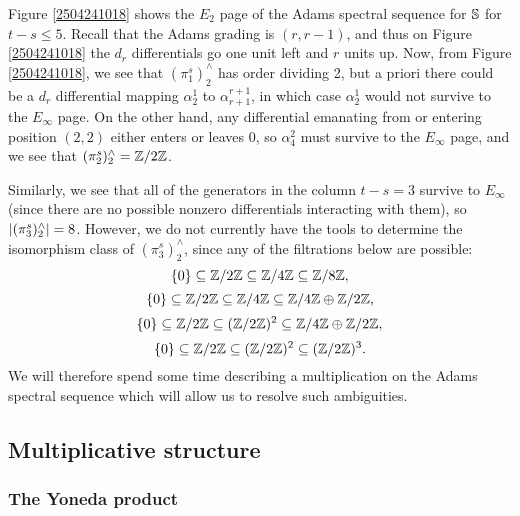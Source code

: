 \documentclass[11pt, titlepage]{article} %
\def\bb{\ensuremath\mathbb}
\def\subq{\ensuremath\subseteq}
\def\inte{\ensuremath\mathbb{Z}}
\numberwithin{equation}{subsection}
\theoremstyle{plain}
\theoremstyle{definition}
\begin{document}
Figure \ref{2504241018} shows the \(E_2\) page of the Adams spectral sequence for \(\bb{S}\) for \(t-s\leq 5\). Recall that the Adams grading is \((r, r-1)\), and thus on Figure \ref{2504241018} the \(d_r\) differentials go one unit left and \(r\) units up. Now, from Figure \ref{2504241018}, we see that \((\pi_1^s)^\wedge_2\) has order dividing 2, but a priori there could be a \(d_r\) differential mapping \(\alpha^1_2\) to \(\alpha^{r+1}_{r+1}\), in which case \(\alpha^1_2\) would not survive to the \(E_\infty\) page. On the other hand, any differential emanating from or entering position \((2,2)\) either enters or leaves 0, so \(\alpha^2_4\) must survive to the \(E_\infty\) page, and we see that \((\pi_2^s)^\wedge_2=\inte/2\inte\). 

Similarly, we see that all of the generators in the column \(t-s=3\) survive to \(E_\infty\) (since there are no possible nonzero differentials interacting with them), so \(\lvert(\pi_3^s)^\wedge_2\rvert=8\). However, we do not currently have the tools to determine the isomorphism class of \((\pi_3^s)^\wedge_2\), since any of the filtrations below are possible:
\[\{0\}\subq \inte/2\inte\subq \inte/4\inte\subq \inte/8\inte,\]
\[\{0\}\subq \inte/2\inte\subq \inte/4\inte\subq \inte/4\inte\oplus \inte/2\inte,\]
\[\{0\}\subq \inte/2\inte\subq (\inte/2\inte)^2\subq \inte/4\inte\oplus \inte/2\inte,\]
\[\{0\}\subq \inte/2\inte\subq (\inte/2\inte)^2\subq (\inte/2\inte)^3.\]
We will therefore spend some time describing a multiplication on the Adams spectral sequence which will allow us to resolve such ambiguities.

\subsection{Multiplicative structure}\label{2504291250}

\subsubsection{The Yoneda product}\label{2504171922}
\end{document}
